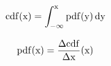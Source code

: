$$ \rm{cdf}(x) = \int_{-\infty}^x \rm{pdf}(y) \,\rm{d}y $$

$$ \rm{pdf}(x) = \frac{\Delta \rm{cdf}}{\Delta x}(x) $$
